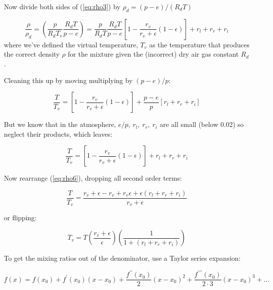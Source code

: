 \documentclass[12pt]{article}
\begin{document}
Now divide both sides of (\ref{eq:rho3}) by $\rho_d = (p-e)/(R_d T)$

\begin{equation}
  \label{eq:rho4}
  \frac{\rho}{\rho_d} = \left ( \frac{p}{R_d T_v} \frac{R_d T}{p -e} \right ) =
\frac{p}{R_d T} \frac{R_d T}{p-e} \left [ 1 -  \frac{r_v}{r_v + \epsilon} (1 - \epsilon) \right ] + r_l + r_r  + r_i
\end{equation}
where we've defined the virtual temperature, $T_v$ as the temperature that produces the correct
density $\rho$ for the mixture given the (incorrect) dry air gas constant $R_d$.

Cleaning this up by moving multiplying by $(p-e)/p$:

\begin{equation}
  \label{eq:rho5}
 \frac{T}{ T_v} = 
 \left [ 1 -  \frac{r_v}{r_v + \epsilon} (1 - \epsilon) \right ] +  \frac{p-e}{p} \left [ r_l + r_r  + r_i \right ] 
\end{equation}

But we know that in the atmosphere, $e/p,\ r_l,\ r_r,\ r_i$ are all small (below 0.02) so 
neglect their products, which leaves:

\begin{equation}
  \label{eq:rho6}
 \frac{T}{ T_v} = 
 \left [ 1 -  \frac{r_v}{r_v + \epsilon} (1 - \epsilon) \right ] +   r_l + r_r  + r_i 
\end{equation}
 
Now rearrange (\ref{eq:rho6}), dropping all second order terms:

\begin{equation}
  \label{eq:rho7}
 \frac{T}{T_v} = \frac{r_v + \epsilon - r_v + r_v \epsilon + \epsilon (r_l + r_r + r_i) }{r_v + \epsilon}
\end{equation}

or flipping:

\begin{equation}
  \label{eq:rho8}
 T_v =  T \left ( \frac{r_v + \epsilon}{\epsilon} \right ) \left ( \frac{ 1  }{1 + (r_l + r_r + r_i)}
 \right )
\end{equation}

To get the mixing ratios out of the denominator, use a Taylor series expansion:

\begin{equation}
  \label{eq:taylor}
  f(x)  = f(x_0) + f^\prime(x_0)(x - x_0) + \frac{f^{\prime\prime}(x_0)}{2}(x-x_0)^2 +
            \frac{f^{\prime\prime\prime}(x_0)}{2\cdot3}(x-x_0)^3 + \ldots
\end{equation}
\end{document}
